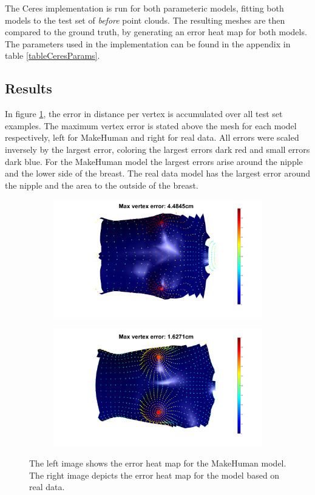 The Ceres implementation is run for both parameteric models, fitting both models to the test set of \textit{before} point clouds. The resulting meshes are then compared to the ground truth, by generating an error heat map for both models. The parameters used in the implementation can be found in the appendix in table \ref{tableCeresParams}.

\subsection{Results}
In figure \ref{fig:compparammodel}, the error in distance per vertex is accumulated over all test set examples. The maximum vertex error is stated above the mesh for each model respectively, left for MakeHuman and right for real data. All errors were scaled inversely by the largest error, coloring the largest errors dark red and small errors dark blue. For the MakeHuman model the largest errors arise around the nipple and the lower side of the breast. The real data model has the largest error around the nipple and the area to the outside of the breast.

\begin{figure}
\centering
\begin{subfigure}{.5\textwidth}
  \centering
  \includegraphics[width=1.1\linewidth]{figures/ceresMhErrorMapBefore}
\end{subfigure}%
\begin{subfigure}{.5\textwidth}
  \centering
  \includegraphics[width=1.1\linewidth]{figures/ceresRealErrorMapBefore}
\end{subfigure}
\caption[Parametric model comparison]{The left image shows the error heat map for the MakeHuman model. The right image depicts the error heat map for the model based on real data.}
\label{fig:compparammodel}
\end{figure}

